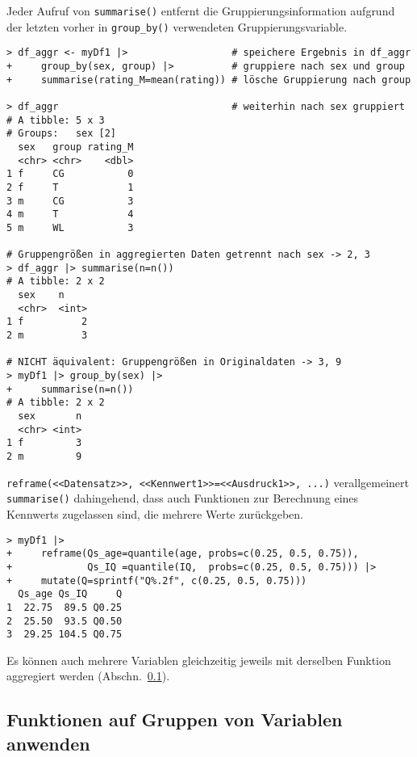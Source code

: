 Jeder Aufruf von \lstinline!summarise()! entfernt die Gruppierungsinformation aufgrund der letzten vorher in \lstinline!group_by()! verwendeten Gruppierungsvariable.
\begin{lstlisting}
> df_aggr <- myDf1 |>                  # speichere Ergebnis in df_aggr
+     group_by(sex, group) |>          # gruppiere nach sex und group
+     summarise(rating_M=mean(rating)) # lösche Gruppierung nach group

> df_aggr                              # weiterhin nach sex gruppiert
# A tibble: 5 x 3
# Groups:   sex [2]
  sex   group rating_M
  <chr> <chr>    <dbl>
1 f     CG           0
2 f     T            1
3 m     CG           3
4 m     T            4
5 m     WL           3

# Gruppengrößen in aggregierten Daten getrennt nach sex -> 2, 3
> df_aggr |> summarise(n=n())
# A tibble: 2 x 2
  sex    n
  <chr>  <int>
1 f          2 
2 m          3

# NICHT äquivalent: Gruppengrößen in Originaldaten -> 3, 9
> myDf1 |> group_by(sex) |>
+     summarise(n=n())
# A tibble: 2 x 2
  sex       n
  <chr> <int>
1 f         3
2 m         9
\end{lstlisting}

\lstinline!reframe(<<Datensatz>>, <<Kennwert1>>=<<Ausdruck1>>, ...)! verallgemeinert \lstinline!summarise()! dahingehend, dass auch Funktionen zur Berechnung eines Kennwerts zugelassen sind, die mehrere Werte zurückgeben.
\begin{lstlisting}
> myDf1 |>
+     reframe(Qs_age=quantile(age, probs=c(0.25, 0.5, 0.75)),
+             Qs_IQ =quantile(IQ,  probs=c(0.25, 0.5, 0.75))) |>
+     mutate(Q=sprintf("Q%.2f", c(0.25, 0.5, 0.75)))
  Qs_age Qs_IQ     Q
1  22.75  89.5 Q0.25
2  25.50  93.5 Q0.50
3  29.25 104.5 Q0.75
\end{lstlisting}

Es können auch mehrere Variablen gleichzeitig jeweils mit derselben Funktion aggregiert werden (Abschn.\ \ref{sec:dplyr_scoped}).

\subsection{Funktionen auf Gruppen von Variablen anwenden}
\label{sec:dplyr_scoped}

